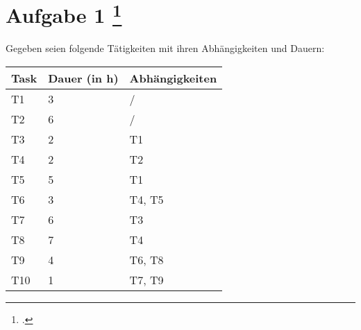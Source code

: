 \documentclass{lehramt-informatik-aufgabe}
\begin{document}
\let\f=\footnotesize
\let\FZ=\liCpmFruehesterI
\let\SZ=\liCpmSpaetesterI

\section{Aufgabe 1
\footcite{examen:66116:2021:03}}

Gegeben seien folgende Tätigkeiten mit ihren Abhängigkeiten und Dauern:

\begin{center}
\begin{tabular}{lll}
\hline
Task & Dauer (in h) & Abhängigkeiten \\\hline
T1   & 3            & / \\
T2   & 6            & / \\
T3   & 2            & T1 \\
T4   & 2            & T2 \\
T5   & 5            & T1 \\
T6   & 3            & T4, T5 \\
T7   & 6            & T3 \\
T8   & 7            & T4 \\
T9   & 4            & T6, T8 \\
T10  & 1            & T7, T9 \\\hline
\end{tabular}
\end{center}
\end{document}
